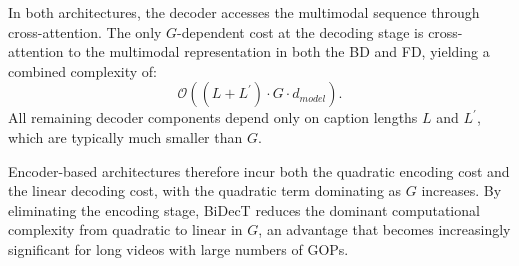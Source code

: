 In both architectures, the decoder accesses the multimodal sequence through cross-attention. The only $G$-dependent cost at the decoding stage is cross-attention to the multimodal representation in both the BD and FD, yielding a combined complexity of:
\begin{equation}
\mathcal{O}\left((L+L^\prime)\cdot G\cdot d_{\textit{model}}\right).
\end{equation}
All remaining decoder components depend only on caption lengths $L$ and $L^\prime$, which are typically much smaller than $G$.

Encoder-based architectures therefore incur both the quadratic encoding cost and the linear decoding cost, with the quadratic term dominating as $G$ increases. By eliminating the encoding stage, BiDecT reduces the dominant computational complexity from quadratic to linear in $G$, an advantage that becomes increasingly significant for long videos with large numbers of GOPs.




